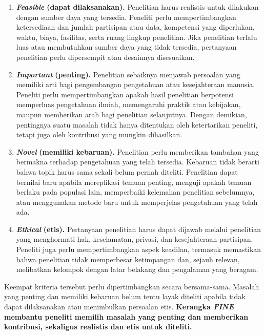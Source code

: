\documentclass[
  indonesian,
  letterpaper,
  DIV=11,
  numbers=noendperiod]{scrreprt}
\providecommand{\tightlist}{%
  \setlength{\itemsep}{0pt}\setlength{\parskip}{0pt}}
\begin{document}
\begin{enumerate}
\def\labelenumi{\arabic{enumi}.}
\tightlist
\item
  \textbf{\emph{Feasible}} \textbf{(dapat dilaksanakan).} Penelitian
  harus realistis untuk dilakukan dengan sumber daya yang tersedia.
  Peneliti perlu mempertimbangkan ketersediaan dan jumlah partisipan
  atau data, kompetensi yang diperlukan, waktu, biaya, fasilitas, serta
  ruang lingkup penelitian. Jika penelitian terlalu luas atau
  membutuhkan sumber daya yang tidak tersedia, pertanyaan penelitian
  perlu dipersempit atau desainnya disesuaikan.
\item
  \textbf{\emph{Important}} \textbf{(penting).} Penelitian sebaiknya
  menjawab persoalan yang memiliki arti bagi pengembangan pengetahuan
  atau kesejahteraan manusia. Peneliti perlu mempertimbangkan apakah
  hasil penelitian berpotensi memperluas pengetahuan ilmiah, memengaruhi
  praktik atau kebijakan, maupun memberikan arah bagi penelitian
  selanjutnya. Dengan demikian, pentingnya suatu masalah tidak hanya
  ditentukan oleh ketertarikan peneliti, tetapi juga oleh kontribusi
  yang mungkin dihasilkan.
\item
  \textbf{\emph{Novel}} \textbf{(memiliki kebaruan).} Penelitian perlu
  memberikan tambahan yang bermakna terhadap pengetahuan yang telah
  tersedia. Kebaruan tidak berarti bahwa topik harus sama sekali belum
  pernah diteliti. Penelitian dapat bernilai baru apabila mereplikasi
  temuan penting, menguji apakah temuan berlaku pada populasi lain,
  memperbaiki kelemahan penelitian sebelumnya, atau menggunakan metode
  baru untuk memperjelas pengetahuan yang telah ada.
\item
  \textbf{\emph{Ethical}} \textbf{(etis).} Pertanyaan penelitian harus
  dapat dijawab melalui penelitian yang menghormati hak, keselamatan,
  privasi, dan kesejahteraan partisipan. Peneliti juga perlu
  mempertimbangkan aspek keadilan, termasuk memastikan bahwa penelitian
  tidak memperbesar ketimpangan dan, sejauh relevan, melibatkan kelompok
  dengan latar belakang dan pengalaman yang beragam.
\end{enumerate}

Keempat kriteria tersebut perlu dipertimbangkan secara bersama-sama.
Masalah yang penting dan memiliki kebaruan belum tentu layak diteliti
apabila tidak dapat dilaksanakan atau menimbulkan persoalan etis.
\textbf{Kerangka \emph{FINE} membantu peneliti memilih masalah yang
penting dan memberikan kontribusi, sekaligus realistis dan etis untuk
diteliti.}
\end{document}
